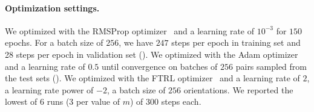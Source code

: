 \paragraph{Optimization settings.}
We optimized  with the RMSProp optimizer~\cite{tieleman2012rmsprop} and a learning rate of $10^{-3}$ for $150$ epochs. For a batch size of $256$, we have $247$ steps per epoch in training set and 28 steps per epoch in validation set ().
We optimized  with the Adam optimizer~\cite{kingma2014adam} and a learning rate of $0.5$ until convergence on batches of $256$ pairs sampled from the test sets ().
We optimized  with the FTRL optimizer~\cite{mcmahan2013ftrl} and a learning rate of $2$, a learning rate power of $-2$, a batch size of $256$ orientations. We reported the lowest of 6 runs (3 per value of $m$) of 300 steps each.



